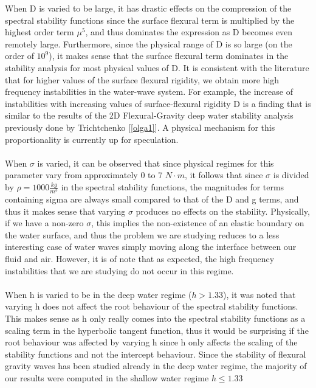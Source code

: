 \documentclass{article}
\begin{document}
When D is varied to be large, it has drastic effects on the compression of the spectral stability functions since the surface flexural term is multiplied by the highest order term \(\mu ^ 5\), and thus dominates the expression as D becomes even remotely large. Furthermore, since the physical range of D is so large (on the order of \(10^9\)), it makes sense that the surface flexural term dominates in the stability analysis for most physical values of D. It is consistent with the literature that for higher values of the surface flexural rigidity, we obtain more high frequency instabilities in the water-wave system. For example, the increase of instabilities with increasing values of surface-flexural rigidity D is a finding that is similar to the results of the 2D Flexural-Gravity deep water stability analysis previously done by Trichtchenko [\ref{olga1}]. A physical mechanism for this proportionality is currently up for speculation. 
\\
\\


When \(\sigma\) is varied, it can be observed that since physical regimes for this parameter vary from approximately 0 to 7 \(N \cdot m\), it follows that since \(\sigma\) is divided by \(\rho = 1000 \frac{kg}{m^3}\) in the spectral stability functions, the magnitudes for terms containing sigma are always small compared to that of the D and g terms, and thus it makes sense that varying \(\sigma\) produces no effects on the stability. Physically, if we have a non-zero \(\sigma\), this implies the non-existence of an elastic boundary on the water surface, and thus the problem we are studying reduces to a less interesting case of water waves simply moving along the interface between our fluid and air. However, it is of note that as expected, the high frequency instabilities that we are studying do not occur in this regime. 
\\
\\

When h is varied to be in the deep water regime (\(h > 1.33\)), it was noted that varying h does not affect the root behaviour of the spectral stability functions. This makes sense as h only really comes into the spectral stability functions as a scaling term in the hyperbolic tangent function, thus it would be surprising if the root behaviour was affected by varying h since h only affects the scaling of the stability functions and not the intercept behaviour. Since the stability of flexural gravity waves has been studied already in the deep water regime, the majority of our results were computed in the shallow water regime \(h \leq 1.33\) 
\\
\\
\end{document}
